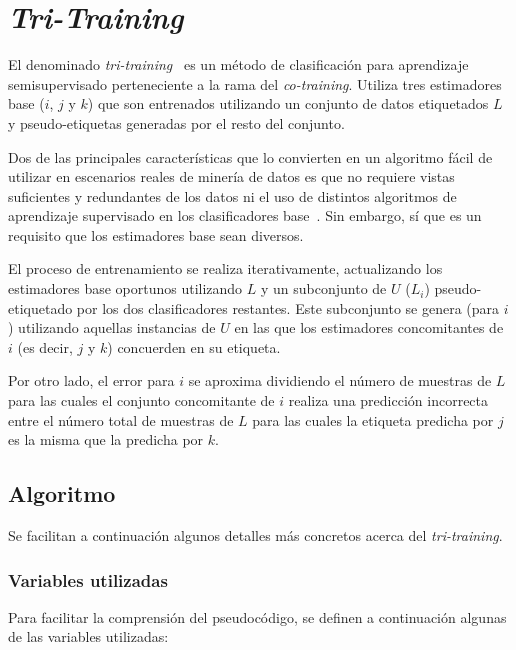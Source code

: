 \section{\textit{Tri-Training}}
\label{tritraining-teoria}

El denominado \textit{tri-training}~\cite{tritraining2005@original} es un método de clasificación para aprendizaje semisupervisado perteneciente a la rama del \textit{co-training}. Utiliza tres estimadores base ($i$, $j$ y $k$) que son entrenados utilizando un conjunto de datos etiquetados $L$ y pseudo-etiquetas generadas por el resto del conjunto.

Dos de las principales características que lo convierten en un algoritmo fácil de utilizar en escenarios reales de minería de datos es que no requiere vistas suficientes y redundantes de los datos ni el uso de distintos algoritmos de aprendizaje supervisado en los clasificadores base~\cite{tritraining2005@original}. Sin embargo, sí que es un requisito que los estimadores base sean diversos.

El proceso de entrenamiento se realiza iterativamente, actualizando los estimadores base oportunos utilizando $L$ y un subconjunto de $U$ ($L_i$) pseudo-etiquetado por los dos clasificadores restantes. Este subconjunto se genera (para $i$) utilizando aquellas instancias de $U$ en las que los estimadores concomitantes de $i$ (es decir, $j$ y $k$) concuerden en su etiqueta.

Por otro lado, el error para $i$ se aproxima dividiendo el número de muestras de $L$ para las cuales el conjunto concomitante de $i$ realiza una predicción incorrecta entre el número total de muestras de $L$ para las cuales la etiqueta predicha por $j$ es la misma que la predicha por $k$.

\subsection{Algoritmo}

Se facilitan a continuación algunos detalles más concretos acerca del \textit{tri-training}.

\subsubsection{Variables utilizadas}

Para facilitar la comprensión del pseudocódigo, se definen a continuación algunas de las variables utilizadas:

